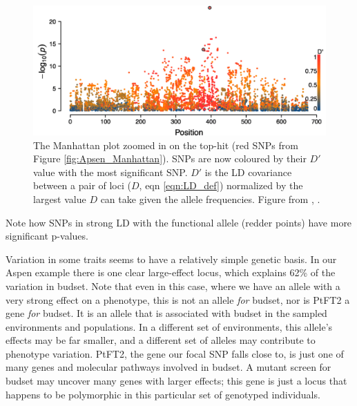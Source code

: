 \begin{figure}
\begin{center}
\includegraphics[width=\textwidth]{Journal_figs/Quant_gen/Wang_GWAS_poplar/Wang_Fig_zoomed_Manhattan.pdf}
\end{center}
\caption{The Manhattan plot zoomed in on the top-hit (red SNPs from Figure
  \ref{fig:Apsen_Manhattan}). SNPs are now coloured by their $D\prime$
  value with the most significant SNP. $D\prime$ is the LD
  covariance between a pair of loci ($D$, eqn \eqref{eqn:LD_def}) normalized by
  the largest value $D$ can take given the allele frequencies. Figure from \citet{wang:18},  \PLOSccBY. } \label{fig:Apsen_zoom_Manhattan}
\end{figure}
Note how SNPs in strong LD with the functional allele (redder
points) have more significant p-values. 

Variation in some traits seems to have a relatively simple genetic
basis. In our Aspen example there is one clear large-effect locus,
which explains  62\% of the variation in budset. Note that even in this case, where we have an allele with a very strong effect on a phenotype, this is not an allele {\it for} budset, nor is PtFT2 a gene {\it for} budset.  It is an allele that is associated with budset in the sampled environments and populations. In a different set of environments, this allele's effects may be far smaller, and a different set of alleles may contribute to phenotype variation. PtFT2, the gene our focal SNP falls close to, is just one of many genes and molecular pathways involved in budset. A mutant screen for budset may uncover many genes with larger effects; this gene is just a locus that happens to be polymorphic in this particular set of genotyped individuals. 

